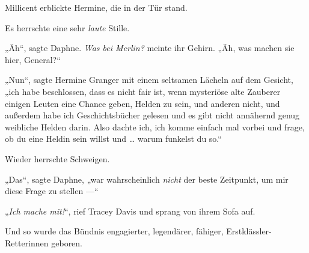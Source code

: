 Millicent erblickte Hermine, die in der Tür stand.

Es herrschte eine sehr \emph{laute} Stille.

„Äh“, sagte Daphne. \emph{Was bei Merlin?} meinte ihr Gehirn. „Äh, was machen sie hier, General?“

„Nun“, sagte Hermine Granger mit einem seltsamen Lächeln auf dem Gesicht, „ich habe beschlossen, dass es nicht fair ist, wenn mysteriöse alte Zauberer einigen Leuten eine Chance geben, Helden zu sein, und anderen nicht, und außerdem habe ich Geschichtsbücher gelesen und es gibt nicht annähernd genug weibliche Helden darin. Also dachte ich, ich komme einfach mal vorbei und frage, ob du eine Heldin sein willst und … warum funkelst du so.“

Wieder herrschte Schweigen.

„Das“, sagte Daphne, „war wahrscheinlich \emph{nicht} der beste Zeitpunkt, um mir diese Frage zu stellen —“

„\emph{Ich mache mit!}“, rief Tracey Davis und sprang von ihrem Sofa auf.

\later

Und so wurde das Bündnis engagierter, legendärer, fähiger, Erstklässler-Retterinnen geboren.%
